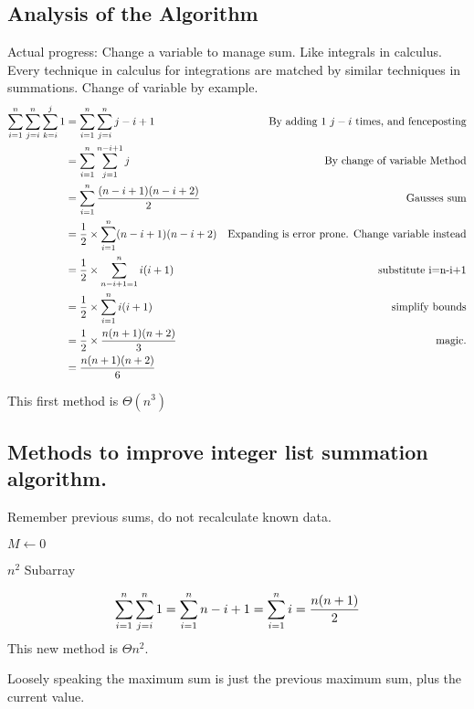 \documentclass[english, 10pt]{article}
\begin{document}
\subsection{Analysis of the Algorithm}
Actual progress: Change a variable to manage sum. Like integrals in calculus. Every technique in calculus for integrations are matched by similar techniques in summations.
Change of variable by example.
\begin{align*}
    \sum_{i=1}^{n} \sum_{j=i}^{n} \sum_{k=i}^{j} 1 &= \sum_{i=1}^{n} \sum_{j=i}^{n} j-i+1 & \text{By adding 1 $j-i$ times, and fenceposting} \\
    &= \sum_{i=1}^{n} \sum_{j=1}^{n-i+1} j & \text{By change of variable Method} \\
    &= \sum_{i=1}^{n} \frac{(n-i+1)(n-i+2)}{2} & \text{Gausses sum} \\
    &= \frac{1}{2}\times \sum_{i=1}^{n} (n-i+1)(n-i+2) & \text{Expanding is error prone. Change variable instead} \\
    &= \frac{1}{2}\times \sum_{n-i+1=1}^{n} i(i+1) & \text{substitute i=n-i+1} \\
    &= \frac{1}{2}\times \sum_{i=1}^{n} i(i+1) & \text{simplify bounds} \\
    &= \frac{1}{2}\times \frac{n(n+1)(n+2)}{3} & \text{magic.} \\
    &= \frac{n(n+1)(n+2)}{6} \\
\end{align*}

This first method is $\Theta{\left(n^3\right)}$

\subsection{Methods to improve integer list summation algorithm.}
Remember previous sums, do not recalculate known data.

\begin{algorithm}[H]
$M\gets0$\;
\caption{$n^2$ Subarray }
\end{algorithm}
$$
    \sum_{i=1}^{n} \sum_{j=i}^{n} 1 = \sum_{i=1}^n n-i+1 \\
    = \sum_{i=1}^{n} i = \frac{n(n+1)}{2}
$$
This new method is $\Theta{n^2} $.

Loosely speaking the maximum sum is just the previous maximum sum, plus the current value.
\end{document}
